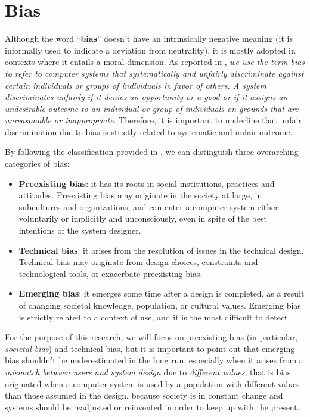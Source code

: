 \section{Bias}
Although the word ``\textbf{bias}'' doesn't have an intrinsically negative meaning (it is informally used to indicate a deviation from neutrality), it is mostly adopted in contexts where it entails a moral dimension. As reported in \cite[p.332]{friedman2017bias}, \emph{we use the term bias to refer to computer systems that \textit{systematically} and \textit{unfairly discriminate} against certain individuals or groups of individuals in favor of others. A system discriminates unfairly if it denies an opportunity or a good or if it assigns an undesirable outcome to an individual or group of individuals on grounds that are unreasonable or inappropriate}. Therefore, it is important to underline that unfair discrimination due to bias is strictly related to systematic and unfair outcome.

By following the classification provided in \cite{friedman2017bias}, we can distinguish three overarching categories of bias:
\begin{itemize}
\item \textbf{Preexisting bias}: it has its roots in social institutions, practices and attitudes. Preexisting bias may originate in the society at large, in subcultures and organizations, and can enter a computer system either voluntarily or implicitly and unconsciously, even in spite of the best intentions of the system designer.
\item \textbf{Technical bias}: it arises from the resolution of issues in the technical design. Technical bias may originate from design choices, constraints and technological tools, or exacerbate preexisting bias.
\item \textbf{Emerging bias}: it emerges some time after a design is completed, as a result of changing societal knowledge, population, or cultural values. Emerging bias is strictly related to a context of use, and it is the most difficult to detect.
\end{itemize}

For the purpose of this research, we will focus on preexisting bias (in particular, \textit{societal bias}) and technical bias, but it is important to point out that emerging bias shouldn't be underestimated in the long run, especially when it arises from a \textit{mismatch between users and system design} due to \textit{different values}, that is bias originated when a computer system is used by a population with different values than those assumed in the design, because society is in constant change and systems should be readjusted or reinvented in order to keep up with the present.

